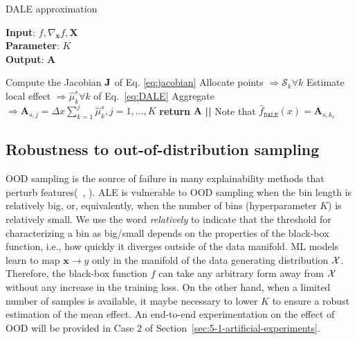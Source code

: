 \documentclass[wcp]{jmlr}
\newcommand{\dale}{\hat{f}_{\mathtt{DALE}}}
\newcommand{\xb}{\mathbf{x}} \newcommand{\R}{\mathbb{R}}
\begin{document}
\begin{algorithm}[h]
\caption{DALE approximation}
\label{alg:dale}
\textbf{Input}: \( f, \nabla_{\mathbf{x}} f, \mathbf{X} \) \\
\textbf{Parameter}: \( K \) \\
\textbf{Output}: \(\mathbf{A}\)
\begin{algorithmic}[1] %
\STATE Compute the Jacobian \(\mathbf{J}\) of Eq. \eqref{eq:jacobian}
\STATE Allocate points \( \Rightarrow \mathcal{S}_k \forall k \)
\STATE Estimate local effect \( \Rightarrow \hat{\mu}_k^s \forall k\) of Eq.~\eqref{eq:DALE}
\STATE Aggregate \( \Rightarrow \mathbf{A}_{s,j} = \Delta x\sum_{k=1}^{j} \hat{\mu}_k^s, j =  1, \ldots, K \)
\ENDFOR
\STATE \textbf{return} \(\mathbf{A}\) \textbf{||} Note that \( \dale(x) = \mathbf{A}_{s,k_x} \)
\end{algorithmic}
\end{algorithm}


\subsection{Robustness to out-of-distribution sampling}
\label{sec:4-3-robustness}
OOD sampling is the source of failure in many explainability methods
that perturb features(~\cite{Baniecki2022}, \cite{Hooker2021}). ALE is
vulnerable to OOD sampling when the bin length is relatively big, or,
equivalently, when the number of bins (hyperparameter \(K\)) is
relatively small. We use the word \textit{relatively} to indicate that
the threshold for characterizing a bin as big/small depends on the
properties of the black-box function, i.e., how quickly it diverges
outside of the data manifold. ML models learn to map
\( \xb \rightarrow y \) only in the manifold of the data generating
distribution \(\mathcal{X}\). Therefore, the black-box function \(f\) can take
any arbitrary form away from \(\mathcal{X}\) without any increase in the
training loss. On the other hand, when a limited number of samples is
available, it maybe necessary to lower \(K\) to ensure a robust
estimation of the mean effect. An end-to-end experimentation on the
effect of OOD will be provided in Case 2 of
Section~\ref{sec:5-1-artificial-experiments}.
\end{document}
